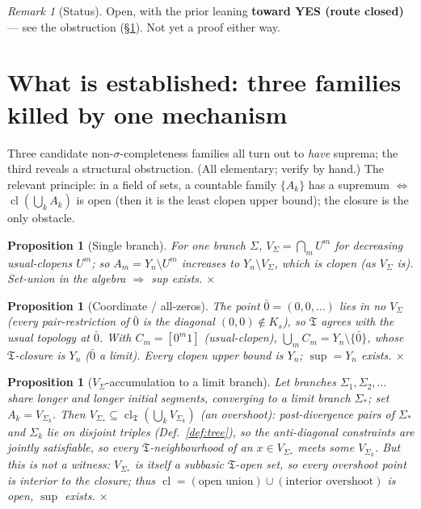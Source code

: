 \documentclass[11pt]{article}
\newtheorem{proposition}[theorem]{Proposition}
\theoremstyle{definition}
\theoremstyle{remark}
\newtheorem{remark}[theorem]{Remark}
\newcommand{\cl}{\operatorname{cl}}
\newcommand{\Y}{Y_n}
\newcommand{\T}{\mathfrak{T}}
\newcommand{\Ks}{K_s}
\begin{document}
\begin{remark}[Status]\label{rem:status}
Open, with the prior leaning \textbf{toward YES (route closed)} --- see the
obstruction (\S\ref{sec:obstruction}). Not yet a proof either way.
\end{remark}

\section{What is established: three families killed by one mechanism}\label{sec:obstruction}

Three candidate non-$\sigma$-completeness families all turn out to \emph{have}
suprema; the third reveals a structural obstruction. (All elementary; verify by
hand.) The relevant principle: in a field of sets, a countable family $\{A_k\}$ has
a supremum $\iff$ $\cl(\bigcup_k A_k)$ is open (then it is the least clopen upper
bound); the closure is the only obstacle.

\begin{proposition}[Single branch]\label{prop:single}
For one branch $\Sigma$, $V_\Sigma=\bigcap_m U^m$ for decreasing usual-clopens
$U^m$; so $A_m=\Y\setminus U^m$ increases to $\Y\setminus V_\Sigma$, which is clopen
(as $V_\Sigma$ is). Set-union in the algebra $\Rightarrow$ sup exists. \hfill$\times$
\end{proposition}

\begin{proposition}[Coordinate / all-zeros]\label{prop:zeros}
The point $\bar 0=(0,0,\dots)$ lies in \emph{no} $V_\Sigma$ (every pair-restriction
of $\bar 0$ is the diagonal $(0,0)\notin\Ks$), so $\T$ agrees with the usual
topology at $\bar0$. With $C_m=[0^m1]$ (usual-clopen), $\bigcup_m C_m=\Y\setminus\{\bar0\}$,
whose $\T$-closure is $\Y$ ($\bar0$ a limit). Every clopen upper bound is $\Y$;
$\sup=\Y$ exists. \hfill$\times$
\end{proposition}

\begin{proposition}[$V_\Sigma$-accumulation to a limit branch]\label{prop:accum}
Let branches $\Sigma_1,\Sigma_2,\dots$ share longer and longer initial segments,
converging to a limit branch $\Sigma_*$; set $A_k=V_{\Sigma_k}$. Then
$V_{\Sigma_*}\subseteq\cl_\T(\bigcup_k V_{\Sigma_k})$ (an \emph{overshoot}):
post-divergence pairs of $\Sigma_*$ and $\Sigma_k$ lie on \emph{disjoint} triples
(Def.~\ref{def:tree}), so the anti-diagonal constraints are jointly satisfiable,
so every $\T$-neighbourhood of an $x\in V_{\Sigma_*}$ meets some $V_{\Sigma_k}$.
\emph{But this is not a witness:} $V_{\Sigma_*}$ is itself a subbasic $\T$-open set,
so every overshoot point is \emph{interior} to the closure; thus
$\cl=(\text{open union})\cup(\text{interior overshoot})$ is open, $\sup$ exists.
\hfill$\times$
\end{proposition}
\end{document}

